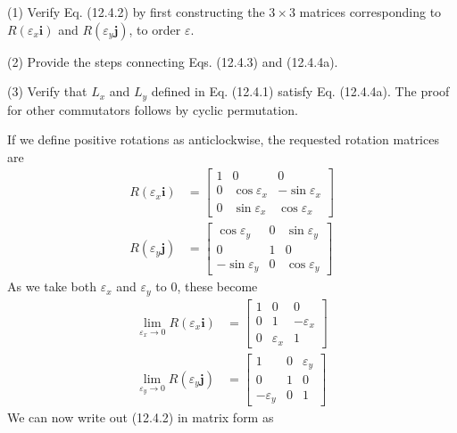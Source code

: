 \documentclass[../principles-of-quantum-mechanics.tex]{subfiles}
\begin{document}
\begin{questions}
	\question (1) Verify Eq. (12.4.2) by first constructing the $3\times3$ matrices corresponding to $R(\varepsilon_x\mathbf{i})$ and $R(\varepsilon_y\mathbf{j})$, to order $\varepsilon$.
	
	(2) Provide the steps connecting Eqs. (12.4.3) and (12.4.4a).

	(3) Verify that $L_x$ and $L_y$ defined in Eq. (12.4.1) satisfy Eq. (12.4.4a). The proof for other commutators follows by cyclic permutation.
	
	\begin{solution}
		If we define positive rotations as anticlockwise, the requested rotation matrices are
		\begin{align*}
			R(\varepsilon_x \mathbf{i}) &= \begin{bmatrix}1 & 0 & 0 \\ 0 & \cos\varepsilon_x & -\sin\varepsilon_x \\ 0 & \sin\varepsilon_x & \cos\varepsilon_x\end{bmatrix} \\
			R(\varepsilon_y \mathbf{j}) &= \begin{bmatrix}\cos\varepsilon_y & 0 & \sin\varepsilon_y \\ 0 & 1 & 0 \\ -\sin\varepsilon_y & 0 & \cos\varepsilon_y\end{bmatrix}
		\end{align*}
		As we take both $\varepsilon_x$ and $\varepsilon_y$ to $0$, these become
		\begin{align*}
			\lim_{\varepsilon_x\to 0}R(\varepsilon_x\mathbf{i}) &= \begin{bmatrix}1 & 0 & 0 \\ 0 & 1 & -\varepsilon_x \\ 0 & \varepsilon_x & 1\end{bmatrix} \\
			\lim_{\varepsilon_y\to0}R(\varepsilon_y\mathbf{j}) &= \begin{bmatrix}1 & 0 & \varepsilon_y \\ 0 & 1 & 0 \\ -\varepsilon_y & 0 & 1\end{bmatrix}
		\end{align*}
		We can now write out (12.4.2) in matrix form as
		\begin{align*}

\end{align*}
\end{solution}
\end{questions}
\end{document}
